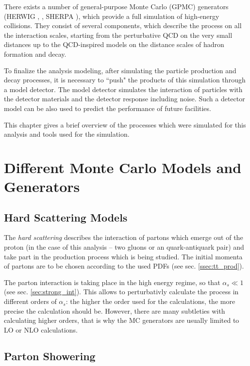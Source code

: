 There exists a number of general-purpose Monte Carlo (GPMC) generators (HERWIG \cite{Corcella:2000bw},  \cite{Sjostrand:2006za}, 
SHERPA \cite{Gleisberg:2003xi}), which provide a full simulation of high-energy collisions. They consist of several components,
which describe the process on all the interaction scales, starting from the perturbative QCD on the very small distances up to
the QCD-inspired models on the distance scales of hadron formation and decay. 

To finalize the analysis modeling, after simulating the particle production and decay processes, it is necessary 
to ``push" the products of this simulation through a model detector. The model detector simulates the interaction of particles 
with the detector materials and the detector response including noise. Such a detector model can be also used to predict the performance 
of future facilities.

This chapter gives a brief overview of the processes which were simulated for this analysis and tools used for 
the simulation.

\section{Different Monte Carlo Models and Generators}
\subsection{Hard Scattering Models}

The \textit{hard scattering} describes the interaction of partons which emerge out of the proton (in the case of this analysis 
-- two gluons or an quark-antiquark pair) and take part in the production process which is being studied. The initial momenta 
of partons are to be chosen according to the used PDFs (see sec. \ref{ssec:tt_prod}).

The parton interaction is taking place in the high energy regime, so that $\alpha_{s} \ll 1$ (see sec. \ref{sec:strong_int}). 
This allows to perturbativly calculate the process in different orders of $\alpha_{s}$: the higher the order used
for the calculations, the more precise the calculation should be. However, there are many subtleties with calculating 
higher orders, that is why the MC generators are usually limited to LO or NLO calculations.


\subsection{Parton Showering}

